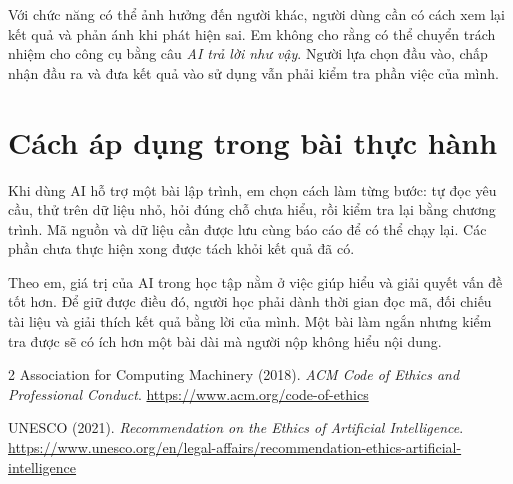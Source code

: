 \documentclass[pdflatex,sn-mathphys-num]{sn-jnl}
\begin{document}
Với chức năng có thể ảnh hưởng đến người khác, người dùng cần có cách xem lại kết quả và phản ánh khi phát hiện sai. Em không cho rằng có thể chuyển trách nhiệm cho công cụ bằng câu \textit{AI trả lời như vậy}. Người lựa chọn đầu vào, chấp nhận đầu ra và đưa kết quả vào sử dụng vẫn phải kiểm tra phần việc của mình.

\section{Cách áp dụng trong bài thực hành}
Khi dùng AI hỗ trợ một bài lập trình, em chọn cách làm từng bước: tự đọc yêu cầu, thử trên dữ liệu nhỏ, hỏi đúng chỗ chưa hiểu, rồi kiểm tra lại bằng chương trình. Mã nguồn và dữ liệu cần được lưu cùng báo cáo để có thể chạy lại. Các phần chưa thực hiện xong được tách khỏi kết quả đã có.

Theo em, giá trị của AI trong học tập nằm ở việc giúp hiểu và giải quyết vấn đề tốt hơn. Để giữ được điều đó, người học phải dành thời gian đọc mã, đối chiếu tài liệu và giải thích kết quả bằng lời của mình. Một bài làm ngắn nhưng kiểm tra được sẽ có ích hơn một bài dài mà người nộp không hiểu nội dung.

\begin{thebibliography}{2}
Association for Computing Machinery (2018).
\textit{ACM Code of Ethics and Professional Conduct}.
\url{https://www.acm.org/code-of-ethics}

UNESCO (2021).
\textit{Recommendation on the Ethics of Artificial Intelligence}.
\url{https://www.unesco.org/en/legal-affairs/recommendation-ethics-artificial-intelligence}
\end{thebibliography}
\end{document}
